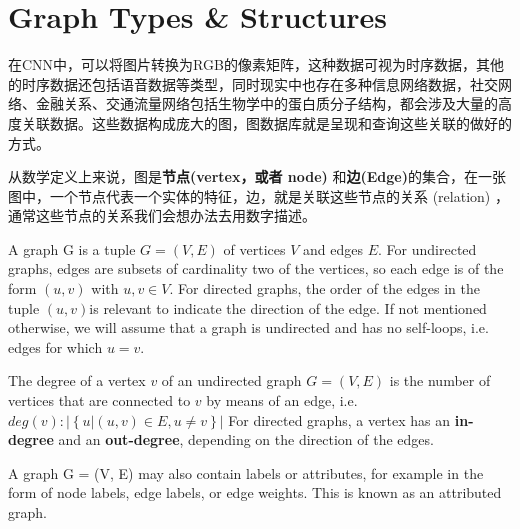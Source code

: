 
\section{Graph Types \& Structures}
     在CNN中，可以将图片转换为RGB的像素矩阵，这种数据可视为时序数据，其他的时序数据还包括语音数据等类型，同时现实中也存在多种信息网络数据，社交网络、金融关系、交通流量网络包括生物学中的蛋白质分子结构，都会涉及大量的高度关联数据。这些数据构成庞大的图，图数据库就是呈现和查询这些关联的做好的方式。

     从数学定义上来说，图是{\bf 节点(vertex，或者 node) }和{\bf 边(Edge)}的集合，在一张图中，一个节点代表一个实体的特征，边，就是关联这些节点的关系 (relation) ，通常这些节点的关系我们会想办法去用数字描述。

     \begin{mydef}[Graph] 
        A graph G is a tuple  $ G = (V, E)  $ of vertices $V$ and edges $E$. For  undirected graphs, edges are subsets of cardinality two of the vertices, so each edge is of the form $(u, v)$ with $u, v \in V$. For directed graphs, the order of the edges in the tuple $(u, v) $is
        relevant to indicate the direction of the edge. If not mentioned otherwise, we will assume
        that a graph is undirected and has no self-loops, i.e. edges for which $u = v$.
     \end{mydef} 

     \begin{mydef}[Degree]
        The degree of a vertex $v$ of an undirected graph $G = (V, E)$ is the number of vertices that are connected to $v$ by means of an edge, i.e. $ deg (v) : 
        \left |  \left \{ u|\left ( u,v \right )  \in E,u \neq v \right \} \right |  $ For directed graphs, a vertex has an {\bf in-degree} and an {\bf out-degree},
        depending on the direction of the edges.
     \end{mydef}

     A graph G = (V, E) may also contain labels or attributes, for example in the form of node labels, edge labels, or edge weights. This is known as an attributed graph.

